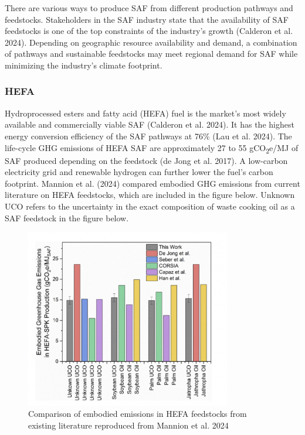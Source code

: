 \documentclass[12pt]{article}
\begin{document}
There are various ways to produce SAF from different production pathways and feedstocks. Stakeholders in the SAF industry state that the availability of SAF feedstocks is one of the top constraints of the industry’s growth (Calderon et al. 2024). Depending on geographic resource availability and demand, a combination of pathways and sustainable feedstocks may meet regional demand for SAF while minimizing the industry’s climate footprint.


\subsubsection{HEFA}

Hydroprocessed esters and fatty acid (HEFA) fuel is the market's most widely available and commercially viable SAF (Calderon et al. 2024). It has the highest energy conversion efficiency of the SAF pathways at 76\% (Lau et al. 2024). The life-cycle GHG emissions of HEFA SAF are approximately 27 to 55 gCO\textsubscript{2}e/MJ of SAF produced depending on the feedstock (de Jong et al. 2017). A low-carbon electricity grid and renewable hydrogen can further lower the fuel's carbon footprint. Mannion et al. (2024) compared embodied GHG emissions from current literature on HEFA feedstocks, which are included in the figure below. Unknown UCO refers to the uncertainty in the exact composition of waste cooking oil as a SAF feedstock in the figure below.

\begin{figure}[H]
\centering
\includegraphics[width=0.8\textwidth]{Fig 3.png} %
\caption{Comparison of embodied emissions in HEFA feedstocks from existing literature reproduced from Mannion et al. 2024}
\label{figure 3}
\end{figure}
\end{document}
